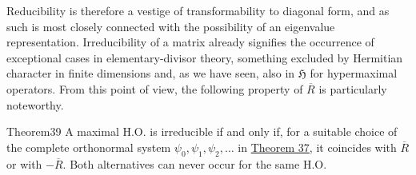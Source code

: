 ﻿\documentclass[paper=b5,fontsize=13pt,bookmarkpackage=false,twoside]{scrartcl}
\begin{document}
Reducibility is therefore a vestige of transformability to diagonal form, and as such is most closely connected with the possibility of an eigenvalue representation. Irreducibility of a matrix already signifies the occurrence of exceptional cases in elementary-divisor theory, something excluded by Hermitian character in finite dimensions and, as we have seen, also in $\mathfrak H$ for hypermaximal operators. From this point of view, the following property of $\overline R$ is particularly noteworthy.

\begin{namedstatement}{Theorem}{39}\label{thm:39}
A maximal H.O. is irreducible if and only if, for a suitable choice of the complete orthonormal system $\psi_0,\psi_1,\psi_2,\ldots$ in \hyperref[thm:37]{Theorem 37}, it coincides with $\overline R$ or with $-\overline R$. Both alternatives can never occur for the same H.O.
\end{namedstatement}
\end{document}
